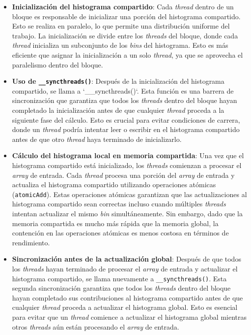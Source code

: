             \begin{itemize}

                \item \textbf{Inicialización del histograma compartido}:  Cada \textit{thread} dentro de un bloque es responsable de inicializar una porción del histograma compartido. Esto se realiza en paralelo, lo que permite una distribución uniforme del trabajo. La inicialización se divide entre los \textit{threads} del bloque, donde cada \textit{thread} inicializa un subconjunto de los \textit{bins} del histograma. Esto es más eficiente que asignar la inicialización a un solo \textit{thread}, ya que se aprovecha el paralelismo dentro del bloque.
                
                \item \textbf{Uso de \texttt{\_\_syncthreads()}}: Después de la inicialización del histograma compartido, se llama a `\_\_syncthreads()`. Esta función es una barrera de sincronización que garantiza que todos los \textit{threads} dentro del bloque hayan completado la inicialización antes de que cualquier \textit{thread} proceda a la siguiente fase del cálculo. Esto es crucial para evitar condiciones de carrera, donde un \textit{thread} podría intentar leer o escribir en el histograma compartido antes de que otro \textit{thread} haya terminado de inicializarlo.
                
                \item \textbf{Cálculo del histograma local en memoria compartida}: Una vez que el histograma compartido está inicializado, los \textit{threads} comienzan a procesar el \textit{array} de entrada. Cada \textit{thread} procesa una porción del \textit{array} de entrada y actualiza el histograma compartido utilizando operaciones atómicas (\texttt{atomicAdd}). Estas operaciones atómicas garantizan que las actualizaciones al histograma compartido sean correctas incluso cuando múltiples \textit{threads} intentan actualizar el mismo \textit{bin} simultáneamente. Sin embargo, dado que la memoria compartida es mucho más rápida que la memoria global, la contención en las operaciones atómicas es menos costosa en términos de rendimiento.
                
                \item \textbf{Sincronización antes de la actualización global}: Después de que todos los \textit{threads} hayan terminado de procesar el \textit{array} de entrada y actualizar el histograma compartido, se llama nuevamente a \texttt{\_\_syncthreads()}. Esta segunda sincronización garantiza que todos los \textit{threads} dentro del bloque hayan completado sus contribuciones al histograma compartido antes de que cualquier \textit{thread} proceda a actualizar el histograma global. Esto es esencial para evitar que un \textit{thread} comience a actualizar el histograma global mientras otros \textit{threads} aún están procesando el \textit{array} de entrada.
                

\end{itemize}
